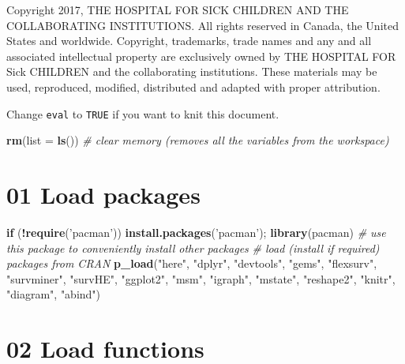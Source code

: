 \documentclass[
]{article}
\newenvironment{Shaded}{\begin{snugshade}}{\end{snugshade}}
\newcommand{\CommentTok}[1]{\textcolor[rgb]{0.56,0.35,0.01}{\textit{#1}}}
\newcommand{\ControlFlowTok}[1]{\textcolor[rgb]{0.13,0.29,0.53}{\textbf{#1}}}
\newcommand{\DataTypeTok}[1]{\textcolor[rgb]{0.13,0.29,0.53}{#1}}
\newcommand{\KeywordTok}[1]{\textcolor[rgb]{0.13,0.29,0.53}{\textbf{#1}}}
\newcommand{\NormalTok}[1]{#1}
\newcommand{\OperatorTok}[1]{\textcolor[rgb]{0.81,0.36,0.00}{\textbf{#1}}}
\newcommand{\StringTok}[1]{\textcolor[rgb]{0.31,0.60,0.02}{#1}}
\begin{document}
Copyright 2017, THE HOSPITAL FOR SICK CHILDREN AND THE COLLABORATING
INSTITUTIONS. All rights reserved in Canada, the United States and
worldwide. Copyright, trademarks, trade names and any and all associated
intellectual property are exclusively owned by THE HOSPITAL FOR Sick
CHILDREN and the collaborating institutions. These materials may be
used, reproduced, modified, distributed and adapted with proper
attribution.

\newpage

Change \texttt{eval} to \texttt{TRUE} if you want to knit this document.

\begin{Shaded}
\begin{Highlighting}[]
\KeywordTok{rm}\NormalTok{(}\DataTypeTok{list =} \KeywordTok{ls}\NormalTok{())      }\CommentTok{# clear memory (removes all the variables from the workspace)}
\end{Highlighting}
\end{Shaded}

\hypertarget{load-packages}{%
\section{01 Load packages}\label{load-packages}}

\begin{Shaded}
\begin{Highlighting}[]
\ControlFlowTok{if}\NormalTok{ (}\OperatorTok{!}\KeywordTok{require}\NormalTok{(}\StringTok{'pacman'}\NormalTok{)) }\KeywordTok{install.packages}\NormalTok{(}\StringTok{'pacman'}\NormalTok{); }\KeywordTok{library}\NormalTok{(pacman) }\CommentTok{# use this package to conveniently install other packages}
\CommentTok{# load (install if required) packages from CRAN}
\KeywordTok{p_load}\NormalTok{(}\StringTok{"here"}\NormalTok{, }\StringTok{"dplyr"}\NormalTok{, }\StringTok{"devtools"}\NormalTok{, }\StringTok{"gems"}\NormalTok{, }\StringTok{"flexsurv"}\NormalTok{, }\StringTok{"survminer"}\NormalTok{, }\StringTok{"survHE"}\NormalTok{, }\StringTok{"ggplot2"}\NormalTok{, }\StringTok{"msm"}\NormalTok{, }\StringTok{"igraph"}\NormalTok{, }\StringTok{"mstate"}\NormalTok{,   }\StringTok{"reshape2"}\NormalTok{, }\StringTok{"knitr"}\NormalTok{, }\StringTok{"diagram"}\NormalTok{, }\StringTok{"abind"}\NormalTok{)                      }
\end{Highlighting}
\end{Shaded}

\hypertarget{load-functions}{%
\section{02 Load functions}\label{load-functions}}
\end{document}
